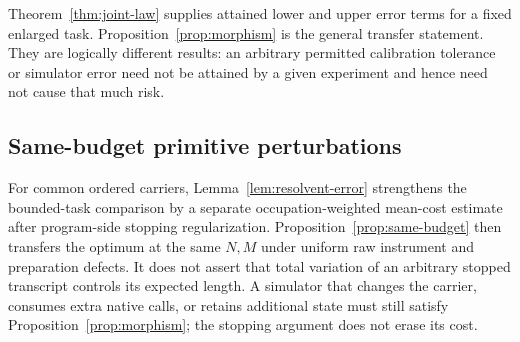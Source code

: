 Theorem~\ref{thm:joint-law} supplies attained lower and upper error terms for a fixed enlarged task. Proposition~\ref{prop:morphism} is the general transfer statement. They are logically different results: an arbitrary permitted calibration tolerance or simulator error need not be attained by a given experiment and hence need not cause that much risk.

\subsection*{Same-budget primitive perturbations}
For common ordered carriers, Lemma~\ref{lem:resolvent-error} strengthens the bounded-task comparison by a separate occupation-weighted mean-cost estimate after program-side stopping regularization. Proposition~\ref{prop:same-budget} then transfers the optimum at the same $N,M$ under uniform raw instrument and preparation defects. It does not assert that total variation of an arbitrary stopped transcript controls its expected length. A simulator that changes the carrier, consumes extra native calls, or retains additional state must still satisfy Proposition~\ref{prop:morphism}; the stopping argument does not erase its cost.
